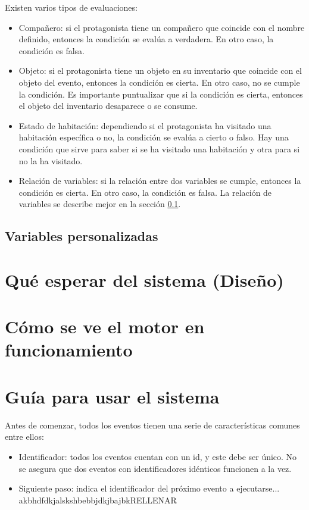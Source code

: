 Existen varios tipos de evaluaciones:
\begin{itemize}
	\item Compañero: si el protagonista tiene un compañero que coincide con el nombre definido, entonces la condición se evalúa a verdadera. En otro caso, la condición es falsa.
	\item Objeto: si el protagonista tiene un objeto en su inventario que coincide con el objeto del evento, entonces la condición es cierta. En otro caso, no se cumple la condición. Es importante puntualizar que si la condición es cierta, entonces el objeto del inventario desaparece o se consume.
	\item Estado de habitación: dependiendo si el protagonista ha visitado una habitación específica o no, la condición se evalúa a cierto o falso. Hay una condición que sirve para saber si se ha visitado una habitación y otra para si no la ha visitado.
	\item Relación de variables: si la relación entre dos variables se cumple, entonces la condición es cierta. En otro caso, la condición es falsa. La relación de variables se describe mejor en la sección \ref{variablesSection}.
\end{itemize}

\subsection{Variables personalizadas} \label{variablesSection}

\section{Qué esperar del sistema (Diseño)} \label{designSection}

\section{Cómo se ve el motor en funcionamiento}

\section{Guía para usar el sistema}

Antes de comenzar, todos los eventos tienen una serie de características comunes entre ellos:

\begin{itemize}
	\item Identificador: todos los eventos cuentan con un id, y este debe ser único. No se asegura que dos eventos con identificadores idénticos funcionen a la vez.
	\item Siguiente paso: indica el identificador del próximo evento a ejecutarse...
	akbhdfdkjalskshbebbjdkjbajbkRELLENAR
\end{itemize}

